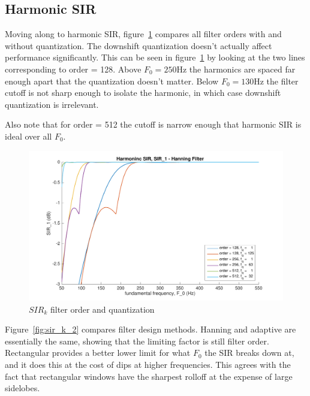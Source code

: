 \documentclass [11pt, proquest,oneside] {ganter_thesis}[2015/03/03]
\begin{document}
\clearpage

\subsection{Harmonic SIR}

Moving along to harmonic SIR, figure~\ref{fig:sir_k_1} compares all filter orders with and without quantization.  The downshift quantization doesn't actually affect performance significantly.  This can be seen in figure~\ref{fig:sir_k_1} by looking at the two lines corresponding to order = 128.  Above $F_0 = 250$Hz the harmonics are spaced far enough apart that the quantization doesn't matter.  Below $F_0 = 130$Hz the filter cutoff is not sharp enough to isolate the harmonic, in which case downshift quantization is irrelevant.

Also note that for order = 512 the cutoff is narrow enough that harmonic SIR is  ideal over all $F_0$.

\begin{figure}[!ht]
  \centering
    \includegraphics[width=1\textwidth]{sir_k_1}   
    \caption{$SIR_k$ filter order and quantization}\label{fig:sir_k_1}
\end{figure}

Figure~\ref{fig:sir_k_2} compares filter design methods.  Hanning and adaptive are essentially the same, showing that the limiting factor is still filter order.  Rectangular provides a better lower limit for what $F_0$ the SIR breaks down at, and it does this at the cost of dips at higher frequencies.  This agrees with the fact that rectangular windows have the sharpest rolloff at the expense of large sidelobes.
\end{document}
